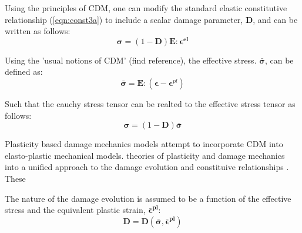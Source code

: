 Using the principles of CDM, one can modify the standard elastic constitutive relationship (\ref{eqn:const3a}) to include a scalar damage parameter, $\mathbf{D}$, and can be written as follows: 
\begin{equation}
\boldsymbol{\sigma}=(1-\mathbf{D})\mathbf{E}:\boldsymbol{\epsilon^{el}}\label{eqn:const3}
\end{equation}

Using the 'usual notions of CDM' (find
reference), the effective stress. $\boldsymbol{\bar{\sigma}}$, can
be defined as: 
\begin{equation}
\boldsymbol{\bar{\sigma}}=\mathbf{E}:(\boldsymbol{\epsilon}-\boldsymbol{\epsilon}^{pl})\label{eqn:const6}
\end{equation}


Such that the cauchy stress tensor can be realted to the effective
stress tensor as follows: 
\begin{equation}
\boldsymbol{\sigma}=(1-\mathbf{D})\boldsymbol{\bar{\sigma}}\label{eqn:const7}
\end{equation}


Plasticity based damage mechanics models attempt to incorporate CDM into elasto-plastic mechanical models. 
theories of plasticity and damage mechanics into a unified approach to the damage evolution and constituive relationships \cite{zhang_continuum_2010}. These 






The nature of the damage evolution is assumed to be a function of
the effective stress and the equivalent plastic strain, $\boldsymbol{\bar{\epsilon}^{pl}}$:
\begin{equation}
\mathbf{D}=\mathbf{D}(\boldsymbol{\bar{\sigma}},\boldsymbol{\bar{\epsilon}^{pl}})\label{eqn:const8}
\end{equation}